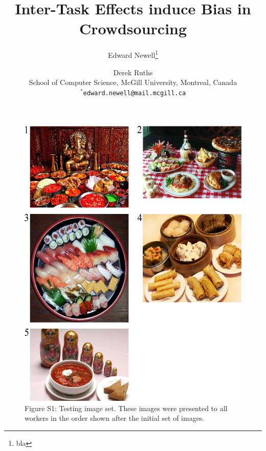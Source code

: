 \documentclass[letterpaper]{article}
\title{Inter-Task Effects induce Bias in Crowdsourcing}
\author{Edward Newell\footnote{bla} \and Derek Ruths\\
School of Computer Science, McGill University, Montreal, Canada\\
$^*$\texttt{edward.newell@mail.mcgill.ca}\\
}
\begin{document}
\begin{figure}
	\includegraphics[scale=1.00]{figs/taskImages/testImages.jpg}
	\caption*{Figure S1: Testing image set. These images were presented to all workers in 
		the order shown after the initial set of images.}
\end{figure}
\end{document}
